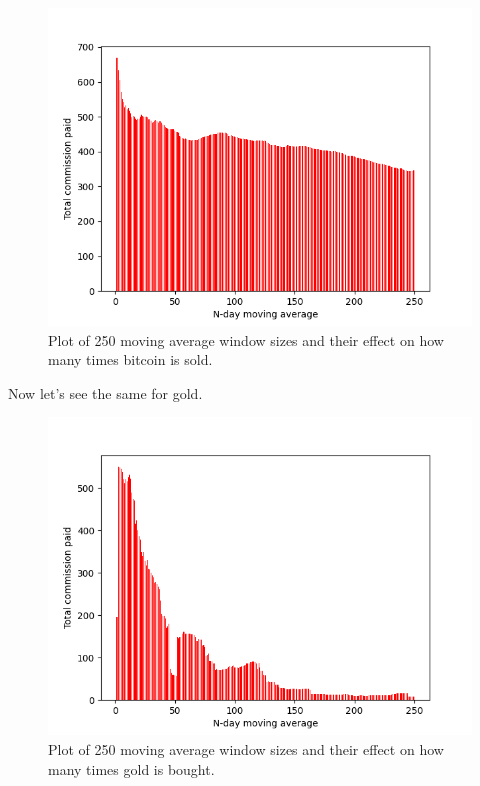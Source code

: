 \documentclass[12pt]{article}
\begin{document}
\begin{figure}[h!]
    \includegraphics[totalheight=8cm]{figures/btc_sales.png}
    \centering
    \caption{Plot of 250 moving average window sizes and their effect on how many times bitcoin is sold.}
    \label{btc_sales}
\end{figure}
\break
Now let's see the same for gold.
\begin{figure}[h!]
    \includegraphics[totalheight=8cm]{figures/gold_pur.png}
    \centering
    \caption{Plot of 250 moving average window sizes and their effect on how many times gold is bought.}
    \label{gold_pur}
\end{figure}
\end{document}
